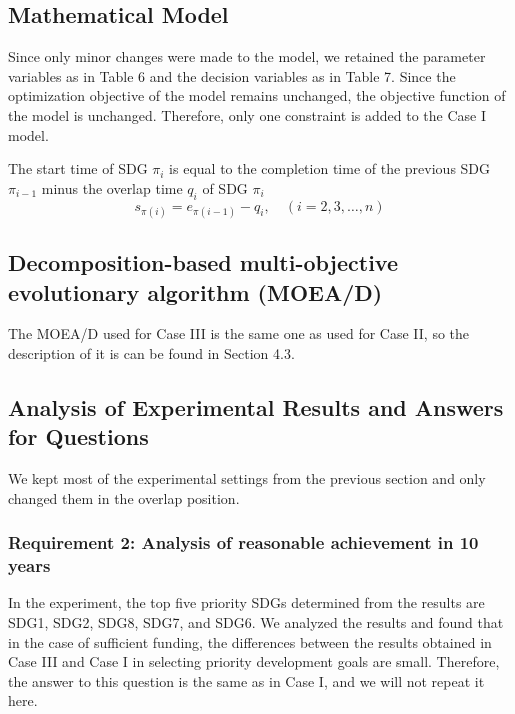 \documentclass[10pt]{mcmthesis}
\begin{document}
\subsection{Mathematical Model}
Since only minor changes were made to the model, we retained the parameter variables as in Table 6 and the decision variables as in Table 7. Since the optimization objective of the model remains unchanged, the objective function of the model is unchanged.
Therefore, only one constraint is added to the Case I model.

The start time of SDG $\pi_{i}$ is equal to the completion time of the previous SDG $\pi_{i-1}$ minus the overlap time $q_i$ of SDG $\pi_{i}$
\begin{equation}
s_{\pi(i)}=e_{\pi(i-1)}-q_i, \quad(i=2,3, \ldots, n)
\end{equation}

\subsection{Decomposition-based multi-objective evolutionary algorithm (MOEA/D)}%
The MOEA/D used for Case III is the same one as used for Case II, so the description of it is can be found in Section 4.3.

\subsection{Analysis of Experimental Results and Answers for Questions}%
We kept most of the experimental settings from the previous section and only changed them in the overlap position.%

\subsubsection{Requirement 2: Analysis of reasonable achievement in 10 years}

In the experiment, the top five priority SDGs determined from the results are SDG1, SDG2, SDG8, SDG7, and SDG6. We analyzed the results and found that in the case of sufficient funding, the differences between the results obtained in Case III and Case I in selecting priority development goals are small. Therefore, the answer to this question is the same as in Case I, and we will not repeat it here.
\end{document}
